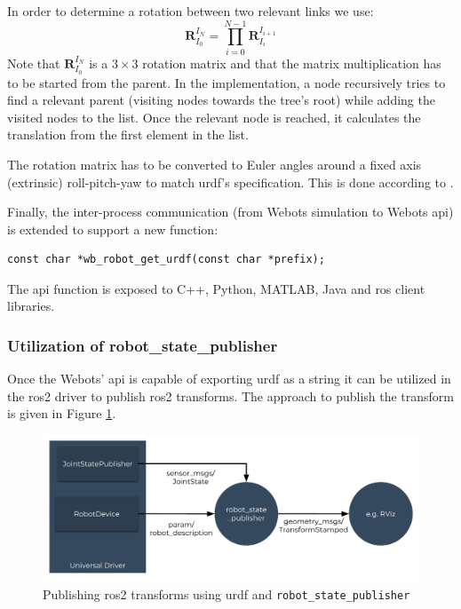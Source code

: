 In order to determine a rotation between two relevant links we use:
\begin{equation}
    \bm{R}_{I_0}^{I_N} = \prod_{i=0}^{N-1} \bm{R}_{I_i}^{I_{i+1}}
\end{equation}
Note that $ \bm{R}_{I_0}^{I_N} $ is a $ 3 \times 3 $ rotation matrix and that the matrix multiplication has to be started from the parent.
In the implementation, a node recursively tries to find a relevant parent (visiting nodes towards the tree's root) while adding the visited nodes to the list.
Once the relevant node is reached, it calculates the translation from the first element in the list.

The rotation matrix has to be converted to Euler angles around a fixed axis (extrinsic) roll-pitch-yaw to match \ac{urdf}'s specification. This is done according to \cite[p. 9]{eberly_euler_nodate}.

Finally, the inter-process communication (from Webots simulation to Webots \ac{api}) is extended to support a new function:

\begin{verbatim}
const char *wb_robot_get_urdf(const char *prefix);
\end{verbatim}

The \ac{api} function is exposed to C++, Python, MATLAB, Java and \ac{ros} client libraries.

\subsubsection{Utilization of robot\_state\_publisher}

Once the Webots' \ac{api} is capable of exporting \ac{urdf} as a string it can be utilized in the \ac{ros2} driver to publish \ac{ros2} transforms.
The approach to publish the transform is given in Figure \ref{fig:generalization:transforms_method_3}.

\begin{figure}[H]
    \centering
    \includegraphics[width=\textwidth]{generalization/figures/transforms_method_3.pdf}
    \caption{Publishing \ac{ros2} transforms using \ac{urdf} and \texttt{robot\_state\_publisher}}
    \label{fig:generalization:transforms_method_3}
\end{figure}

